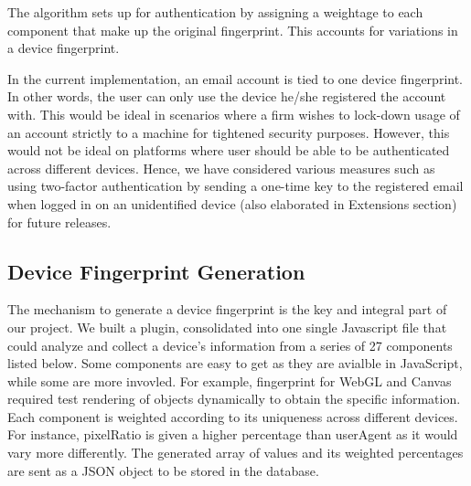 \documentclass{acm_proc_article-sp}
\begin{document}
The algorithm sets up for authentication by assigning a weightage to each component that make up the original fingerprint. This accounts for variations in a device fingerprint.

In the current implementation, an email account is tied to one device fingerprint. In other words, the user can only use the device he/she registered the account with. This would be ideal in scenarios where a firm wishes to lock-down usage of an account strictly to a machine for tightened security purposes. However, this would not be ideal on platforms where user should be able to be authenticated across different devices. Hence, we have considered various measures such as using two-factor authentication by sending a one-time key to the registered email when logged in on an unidentified device (also elaborated in Extensions section) for future releases.



\subsection{Device Fingerprint Generation}
The mechanism to generate a device fingerprint is the key and integral part of our project. We built a plugin, consolidated into one single Javascript file that could analyze and collect a device’s information from a series of 27 components listed below. 
Some components are easy to get as they are avialble in JavaScript, while some are more invovled. For example, fingerprint for WebGL and Canvas required test rendering of objects dynamically to obtain the specific information. 
Each component is weighted according to its uniqueness across different devices. For instance, pixelRatio is given a higher percentage than userAgent as it would vary more differently. The generated array of values and its weighted percentages are sent as a JSON object to be stored in the database. 
\end{document}
